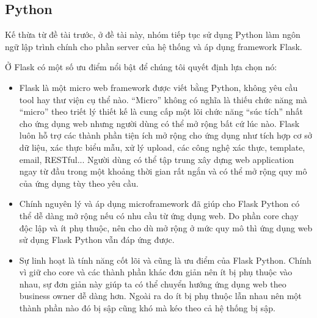 \subsection{Python}
Kế thừa từ đề tài trước, ở đề tài này, nhóm tiếp tục sử dụng Python làm ngôn
ngữ lập trình chính cho phần server của hệ thống và áp dụng framework Flask.
\par
Ở Flask có một số ưu điểm nổi bật để chúng tôi quyết định lựa chọn nó:
\begin{itemize}
    \item Flask là một micro web framework được viết bằng Python, không yêu cầu tool hay
          thư viện cụ thể nào. “Micro” không có nghĩa là thiếu chức năng mà “micro” theo
          triết lý thiết kế là cung cấp một lõi chức năng “súc tích” nhất cho ứng dụng
          web nhưng người dùng có thể mở rộng bất cứ lúc nào. Flask luôn hỗ trợ các thành
          phần tiện ích mở rộng cho ứng dụng như tích hợp cơ sở dữ liệu, xác thực biểu
          mẫu, xử lý upload, các công nghệ xác thực, template, email, RESTful... Người
          dùng có thể tập trung xây dựng web application ngay từ đầu trong một khoảng
          thời gian rất ngắn và có thể mở rộng quy mô của ứng dụng tùy theo yêu cầu.
    \item Chính nguyên lý và áp dụng microframework đã giúp cho Flask Python có thể dễ
          dàng mở rộng nếu có nhu cầu từ ứng dụng web. Do phần core chạy độc lập và ít
          phụ thuộc, nên cho dù mở rộng ở mức quy mô thì ứng dụng web sử dụng Flask
          Python vẫn đáp ứng được.
    \item Sự linh hoạt là tính năng cốt lõi và cũng là ưu điểm của Flask Python. Chính vì
          giữ cho core và các thành phần khác đơn giản nên ít bị phụ thuộc vào nhau, sự
          đơn giản này giúp ta có thể chuyển hướng ứng dụng web theo business owner dễ
          dàng hơn. Ngoài ra do ít bị phụ thuộc lẫn nhau nên một thành phần nào đó bị sập
          cũng khó mà kéo theo cả hệ thống bị sập.
\end{itemize}
